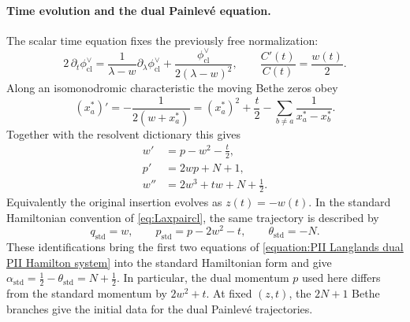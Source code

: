 \documentclass[a4paper,11pt]{article}
\numberwithin{equation}{section}
\begin{document}
\paragraph*{Time evolution and the dual Painlev\'e equation.}
The scalar time equation fixes the previously free normalization:
\begin{equation}
	\label{equation:PII Langlands unscaled time equation}
	2\,\partial_t\phi_{\mathrm{cl}}^{\vee}
	=\frac{1}{\lambda-w}\partial_\lambda\phi_{\mathrm{cl}}^{\vee}
	+\frac{\phi_{\mathrm{cl}}^{\vee}}{2(\lambda-w)^2},
	\qquad \frac{C'(t)}{C(t)}=\frac{w(t)}2.
\end{equation}
Along an isomonodromic characteristic the moving Bethe zeros obey
\begin{equation}
	\label{equation:PII Langlands Bethe zero dynamics}
	(x_a^*)'=-\frac{1}{2(w+x_a^*)}
	=(x_a^*)^2+\frac t2
	-\sum_{b\ne a}\frac{1}{x_a^*-x_b^*}.
\end{equation}
Together with the resolvent dictionary this gives
\begin{equation}
	\label{equation:PII Langlands dual PII Hamilton system}
	\begin{aligned}
		w'&=p-w^2-\frac t2,\\
		p'&=2wp+N+1,\\
		w''&=2w^3+tw+N+\frac12.
	\end{aligned}
\end{equation}
Equivalently the original insertion evolves as $z(t)=-w(t)$.
In the standard Hamiltonian convention of \eqref{eq:Laxpaircl},
the same trajectory is described by
\begin{equation*}
	q_{\mathrm{std}}=w,\qquad
	p_{\mathrm{std}}=p-2w^{2}-t,\qquad
	\theta_{\mathrm{std}}=-N.
\end{equation*}
These identifications bring the first two equations of
\eqref{equation:PII Langlands dual PII Hamilton system} into the
standard Hamiltonian form and give
$\alpha_{\mathrm{std}}=\frac{1}{2}-\theta_{\mathrm{std}}=N+\frac{1}{2}$.
In particular, the dual momentum $p$ used here differs from the
standard momentum by $2w^{2}+t$.
At fixed $(z,t)$, the $2N+1$ Bethe branches give the initial data
for the dual Painlev\'e trajectories.
\end{document}
